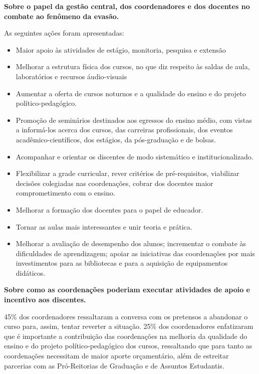 \documentclass{report}
\begin{document}
\textbf{Sobre o papel da gestão central, dos coordenadores e dos docentes no combate ao fenômeno da evasão.}

As seguintes ações foram apresentadas:

\begin{itemize}
\item Maior apoio às atividades de estágio, monitoria, pesquisa e extensão
\item Melhorar a estrutura física dos cursos, no que diz respeito às saldas de aula, laboratórios e recursos áudio-visuais
\item Aumentar a oferta de cursos noturnos e a qualidade do ensino e do projeto político-pedagógico.
\item Promoção de seminários destinados aos egressos do ensino médio, com vistas a informá-los acerca dos cursos, das carreiras profissionais, dos eventos acadêmico-científicos, dos estágios, da pós-graduação e de bolsas.
\item Acompanhar e orientar os discentes de modo sistemático e institucionalizado.
\item Flexibilizar a grade curricular, rever critérios de pré-requisitos, viabilizar decisões colegiadas nas coordenações, cobrar dos docentes maior comprometimento com o ensino.
\item Melhorar a formação dos docentes para o papel de educador.
\item Tornar as aulas mais interessantes e unir teoria e prática.
\item Melhorar a avaliação de desempenho dos alunos; incrementar o combate às dificuldades de aprendizagem; apoiar as iniciativas das coordenações por mais investimentos para as bibliotecas e para a aquisição de equipamentos didáticos.
\end{itemize}

\textbf{Sobre como as coordenações poderiam executar atividades de apoio e incentivo aos discentes.}

45\% dos coordenadores ressaltaram a conversa com os pretensos a abandonar o curso para, assim, tentar reverter a situação. 25\% dos coordenadores enfatizaram que é importante a contribuição das coordenações na melhoria da qualidade do ensino e do projeto político-pedagógico dos cursos, ressaltando que para tanto as coordenações necessitam de maior aporte orçamentário, além de estreitar parcerias com as Pró-Reitorias de Graduação e de Assuntos Estudantis.
\end{document}
